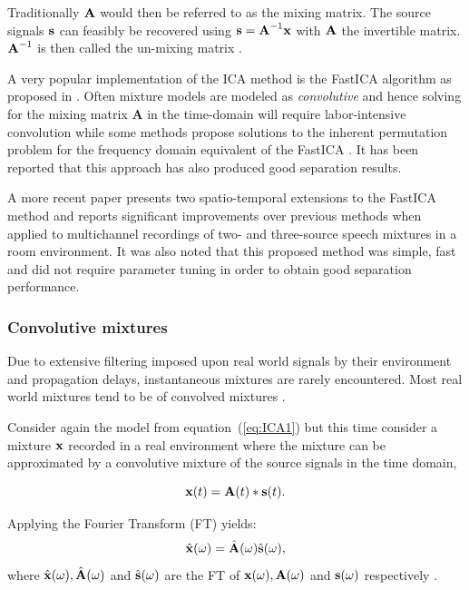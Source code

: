 Traditionally $\textrm{\textbf{A}}$ would then be referred to as the mixing matrix. The source signals $\textrm{\textbf{s}}$ can feasibly be recovered using $\textrm{\textbf{s}} = \textrm{\textbf{A}}^{-1}\textrm{\textbf{x}}$  with $\textrm{\textbf{A}}$ the invertible matrix.  $\textrm{\textbf{A}}^{-1}$ is then called the un-mixing matrix \citep{Smaragdis1998}.

A very popular implementation of the ICA method is the FastICA algorithm as proposed in \cite{Hyvarinen1999}. Often mixture models are modeled as \emph{convolutive} and hence solving for the mixing matrix \textbf{A} in the time-domain will require labor-intensive convolution while some methods propose solutions to the inherent permutation problem for the frequency domain equivalent of the FastICA \citep{Mitianoudis2003}. It has been reported that this approach has also produced good separation results.

A more recent paper \citep{Douglas2007} presents two spatio-temporal extensions to the FastICA method and reports significant improvements over previous methods when applied to multichannel recordings of two- and three-source speech mixtures in a room environment. It was also noted that this proposed method was simple, fast and did not require parameter tuning in order to obtain good separation performance.

\subsubsection{Convolutive mixtures}
Due to extensive filtering imposed upon real world signals by their environment and propagation delays, instantaneous mixtures are rarely encountered. Most real world mixtures tend to be of convolved mixtures \citep{Smaragdis1998}.

Consider again the model from equation~(\ref{eq:ICA1}) but this time consider a mixture $\textrm{\textbf{x}}$ recorded in a real environment where the mixture can be approximated by a convolutive mixture of the source signals in the time domain,

\begin{equation}\label{eq:ICA2}
    \textrm{\textbf{x}}(t) = \textrm{\textbf{A}}(t) \ast\textrm{\textbf{s}}(t).
\end{equation}

Applying the Fourier Transform (FT) yields:
\begin{equation}\label{eq:ICA3}
   \hat{ \textrm{\textbf{x}}}(\omega) = \hat{\textrm{\textbf{A}}}(\omega)\hat{\textrm{\textbf{s}}}(\omega),
\end{equation}
where $\hat{ \textrm{\textbf{x}}}(\omega), \hat{\textrm{\textbf{A}}}(\omega)$ and $\hat{\textrm{\textbf{s}}}(\omega)$ are the FT of $\textrm{\textbf{x}}(\omega), \textrm{\textbf{A}}(\omega)$ and $\textrm{\textbf{s}}(\omega)$ respectively \citep{Ikeda1999}.

